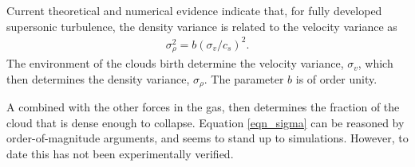 

Current theoretical and
numerical evidence indicate that, for fully developed supersonic turbulence, the density variance is related to the velocity
variance as
\begin{align}
\sigma_\rho^2 = b (\sigma_v/c_s)^2.\label{eqn_sigma}
\end{align}
The environment of the clouds birth determine the velocity variance, $\sigma_v$,
which then determines the density variance, $\sigma_\rho$.  The parameter $b$
is of order unity.  

A combined with the other forces in the
gas, then determines the fraction of the cloud that is
dense enough to collapse.  Equation \ref{eqn_sigma} can be reasoned by
order-of-magnitude arguments, and seems to stand up to simulations.  However, to
date this has not been experimentally verified.





